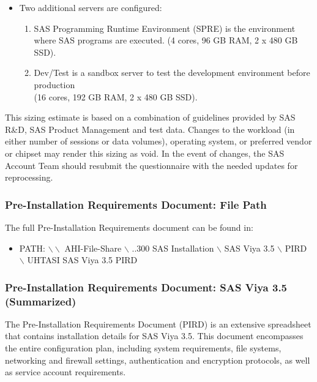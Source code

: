\begin{enumerate}
\begin{itemize}
        \item Two additional servers are configured: 
        \begin{enumerate}
            \item SAS Programming Runtime Environment (SPRE) is the environment where SAS programs are executed. (4 cores, 96 GB RAM, 2 x 480 GB SSD). 
            \item Dev/Test is a sandbox server to test the development environment before production \\(16 cores, 192 GB RAM, 2 x 480 GB SSD).
        \end{enumerate}
    \end{itemize}
    
\end{enumerate}

This sizing estimate is based on a combination of guidelines provided by SAS R\&D, SAS Product Management and test data. Changes to the workload (in either number of sessions or data volumes), operating system, or preferred vendor or chipset may render this sizing as void. In the event of changes, the SAS Account Team should resubmit the questionnaire with the needed updates for reprocessing. 

\subsubsection{Pre-Installation Requirements Document: File Path}\label{6.2.7}
The full Pre-Installation Requirements document can be found in: 
\begin{itemize}
    \item PATH: $\backslash\backslash$ AHI-File-Share $\backslash$ ..300 SAS Installation $\backslash$ SAS Viya 3.5 $\backslash$ PIRD $\backslash$ UHTASI SAS Viya 3.5 PIRD
\end{itemize}

\subsubsection{Pre-Installation Requirements Document: SAS Viya 3.5 (Summarized)}

The Pre-Installation Requirements Document (PIRD) is an extensive spreadsheet that contains installation details for SAS Viya 3.5. This document encompasses the entire configuration plan, including system requirements, file systems, networking and firewall settings, authentication and encryption protocols, as well as service account requirements.

